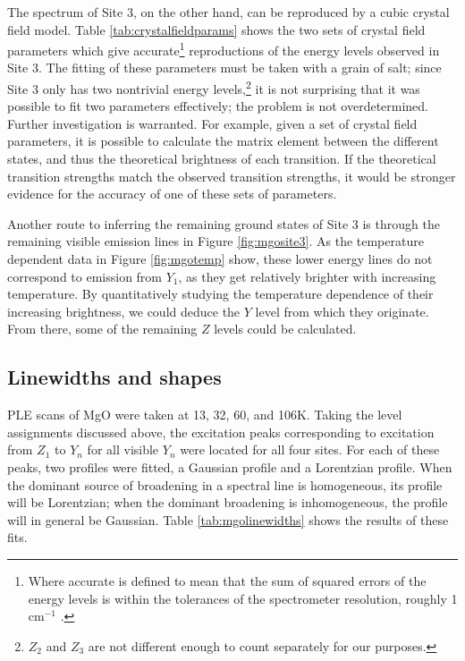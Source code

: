 \documentclass[12pt]{puthesis}
\newcommand{\wn}[1][ ]{cm$^{-1}$#1}
\begin{document}
The spectrum of Site 3, on the other hand, can be reproduced by a cubic crystal field model. Table \ref{tab:crystalfieldparams} shows the two sets of crystal field parameters which give accurate\footnote{Where accurate is defined to mean that the sum of squared errors of the energy levels is within the tolerances of the spectrometer resolution, roughly 1 \wn.} reproductions of the energy levels observed in Site 3. The fitting of these parameters must be taken with a grain of salt; since Site 3 only has two nontrivial energy levels,\footnote{$Z_{2}$ and $Z_{3}$ are not different enough to count separately for our purposes.} it is not surprising that it was possible to fit two parameters effectively; the problem is not overdetermined. Further investigation is warranted. For example, given a set of crystal field parameters, it is possible to calculate the matrix element between the different states, and thus the theoretical brightness of each transition. If the theoretical transition strengths match the observed transition strengths, it would be stronger evidence for the accuracy of one of these sets of parameters.

Another route to inferring the remaining ground states of Site 3 is through the remaining visible emission lines in Figure \ref{fig:mgosite3}. As the temperature dependent data in Figure \ref{fig:mgotemp} show, these lower energy lines do not correspond to emission from $Y_{1}$, as they get relatively brighter with increasing temperature. By quantitatively studying the temperature dependence of their increasing brightness, we could deduce the $Y$ level from which they originate. From there, some of the remaining $Z$ levels could be calculated.


\subsection{Linewidths and shapes}
\label{sec:linewidths-shapes}
PLE scans of MgO were taken at 13, 32, 60, and 106K. Taking the level assignments discussed above, the excitation peaks corresponding to excitation from $Z_{1}$ to $Y_{n}$ for all visible $Y_{n}$ were located for all four sites. For each of these peaks, two profiles were fitted, a Gaussian profile and a Lorentzian profile. When the dominant source of broadening in a spectral line is homogeneous, its profile will be Lorentzian; when the dominant broadening is inhomogeneous, the profile will in general be Gaussian. Table \ref{tab:mgolinewidths} shows the results of these fits.
\end{document}
